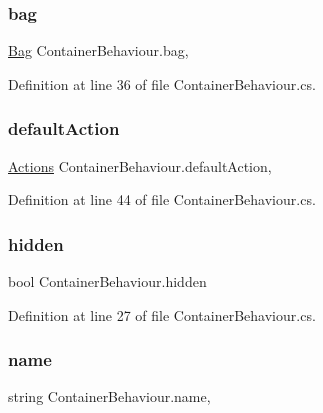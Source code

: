 \subsubsection{\texorpdfstring{bag}{bag}}
{\footnotesize\ttfamily \mbox{\hyperlink{class_bag}{Bag}} Container\+Behaviour.\+bag\hspace{0.3cm}{\ttfamily [get]}, {\ttfamily [set]}}



Definition at line 36 of file Container\+Behaviour.\+cs.

\mbox{\label{class_container_behaviour_a1bcfbc4639219bfa29cec4b58101e589}} 
\subsubsection{\texorpdfstring{defaultAction}{defaultAction}}
{\footnotesize\ttfamily \mbox{\hyperlink{class_container_behaviour_a8ad6b6c9b34c2e0abdaaf0627f87b036}{Actions}} Container\+Behaviour.\+default\+Action\hspace{0.3cm}{\ttfamily [get]}, {\ttfamily [set]}}



Definition at line 44 of file Container\+Behaviour.\+cs.

\mbox{\label{class_container_behaviour_a07f292b549e9dbe4ac987ab2d4140910}} 
\subsubsection{\texorpdfstring{hidden}{hidden}}
{\footnotesize\ttfamily bool Container\+Behaviour.\+hidden\hspace{0.3cm}{\ttfamily [get]}}



Definition at line 27 of file Container\+Behaviour.\+cs.

\mbox{\label{class_container_behaviour_a9b00a643652cbf6ce3806130747c126b}} 
\subsubsection{\texorpdfstring{name}{name}}
{\footnotesize\ttfamily string Container\+Behaviour.\+name\hspace{0.3cm}{\ttfamily [get]}, {\ttfamily [set]}}



